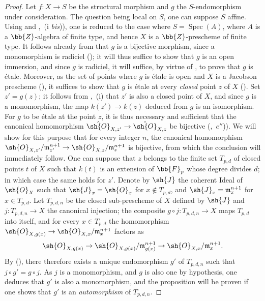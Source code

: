 \begin{proof}
Let $f:X\to S$ be the structural morphism and $g$ the $S$-endomorphism under consideration.
The question being local on $S$, one can suppose $S$ affine.
Using  and ,~(i \emph{bis})), one is reduced to the case where $S=\operatorname{Spec}(A)$, where $A$ is a $\bb{Z}$-algebra of finite type, and hence $X$ is a $\bb{Z}$-prescheme of finite type.
It follows already from  that $g$ is a bijective morphism, since a monomorphism is radiciel (); it will thus suffice to show that $g$ is an open immersion, and since $g$ is radiciel, it will suffice, by virtue of , to prove that $g$ is \'etale.
Moreover, as the set of points where $g$ is \'etale is open and $X$ is a Jacobson prescheme (), it suffices to show that $g$ is \'etale at every \emph{closed} point $z$ of $X$ ().
Set $z'=g(z)$; it follows from ,~(i) that $z'$ is also a closed point of $X$, and since $g$ is a monomorphism, the map $k(z')\to k(z)$ deduced from $g$ is an isomorphism.
For $g$ to be \'etale at the point $z$, it is thus necessary and sufficient that the canonical homomorphism $\hat{\sh{O}}_{X,z'}\to\hat{\sh{O}}_{X,z}$ be bijective (,~$e''$)).
We will show for this purpose that for every integer $n$, the canonical homomorphism $\sh{O}_{X,z'}/\mathfrak{m}_{z'}^{n+1}\to\sh{O}_{X,z}/\mathfrak{m}_z^{n+1}$ is bijective, from which the conclusion will immediately follow.
One can suppose that $z$ belongs to the finite set $T_{p,d}$ of closed points $t$ of $X$ such that $k(t)$ is an extension of $\bb{F}_p$ whose degree divides $d$; in which case the same holds for $z'$.
Denote by $\sh{J}$ the coherent Ideal of $\sh{O}_X$ such that $\sh{J}_x=\sh{O}_x$ for $x\notin T_{p,d}$, and $\sh{J}_x=\mathfrak{m}_x^{n+1}$ for $x\in T_{p,d}$.
Let $T_{p,d,n}$ be the closed sub-prescheme of $X$ defined by $\sh{J}$ and $j:T_{p,d,n}\to X$ the canonical injection; the composite $g\circ j:T_{p,d,n}\to X$ maps $T_{p,d}$ into itself, and for every $x\in T_{p,d}$ the homomorphism $\sh{O}_{X,g(x)}\to\sh{O}_{X,x}/\mathfrak{m}_x^{n+1}$ factors as
\[
  \sh{O}_{X,g(x)} \to \sh{O}_{X,g(x)}/\mathfrak{m}_{g(x)}^{n+1} \to \sh{O}_{X,x}/\mathfrak{m}_x^{n+1}.
\]
By (), there therefore exists a unique endomorphism $g'$ of $T_{p,d,n}$ such that $j\circ g'=g\circ j$.
As $j$ is a monomorphism, and $g$ is also one by hypothesis, one deduces that $g'$ is also a monomorphism, and the proposition will be proven if one shows that $g'$ is an \emph{automorphism} of $T_{p,d,n}$.

\end{proof}
